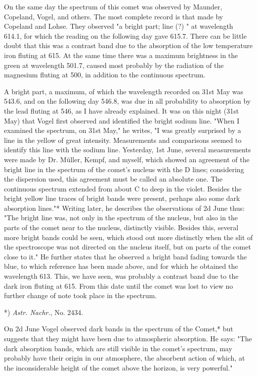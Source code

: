 \documentclass[a4paper, 12pt, oneside, polutonikogreek, english]{article}
\begin{document}
On the same day the spectrum of this comet was observed by Maunder, Copeland, Vogel, and others. The most complete record is that made by Copeland and Lohse. They observed "a bright part; line (?) " at wavelength 614.1, for which the reading on the following day gave 615.7. There can be little doubt that this was a contrast band due to the absorption of the low temperature iron fluting at 615. At the same time there was a maximum brightness in the green at wavelength 501.7, caused most probably by the radiation of the magnesium fluting at 500, in addition to the continuous spectrum.

A bright part, a maximum, of which the wavelength recorded on 31st May was 543.6, and on the following day 546.8, was due in all probability to absorption by the lead fluting at 546, as I have already explained. It was on this night (31st May) that Vogel first observed and identified the bright sodium line. "When I examined the spectrum, on 31st May," he writes, "I was greatly surprised by a line in the yellow of great intensity. Measurements and comparisons seemed to identify this line with the sodium line. Yesterday, 1st June, several measurements were made by Dr. Müller, Kempf, and myself, which showed an agreement of the bright line in the spectrum of the comet's nucleus with the D lines; considering the dispersion used, this agreement must be called an absolute one. The continuous spectrum extended from about C to deep in the violet. Besides the bright yellow line traces of bright bands were present, perhaps also some dark absorption lines."* Writing later, he describes the observations of 2d June thus: "The bright line was, not only in the spectrum of the nucleus, but also in the parts of the comet near to the nucleus, distinctly visible. Besides this, several more bright bands could be seen, which stood out more distinctly when the slit of the spectroscope was not directed on the nucleus itself, but on parts of the comet close to it." He further states that he observed a bright band fading towards the blue, to which reference has been made above, and for which he obtained the wavelength 613. This, we have seen, was probably a contrast band due to the dark iron fluting at 615. From this date until the comet was lost to view no further change of note took place in the spectrum.

*) \emph{Astr. Nachr.}, No. 2434.

On 2d June Vogel observed dark bands in the spectrum of the Comet,* but suggests that they might have been due to atmospheric absorption. He says: "The dark absorption bands, which are still visible in the comet's spectrum, may probably have their origin in our atmosphere, the absorbent action of which, at the inconsiderable height of the comet above the horizon, is very powerful."
\end{document}
